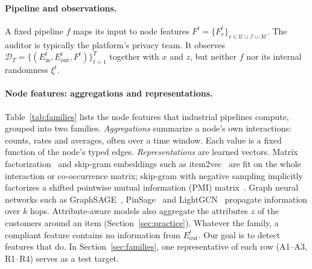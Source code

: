 \documentclass[10pt,twocolumn,letterpaper]{article}
\theoremstyle{definition}
\newcommand{\Ein}{E_{\mathrm{in}}}
\newcommand{\Eout}{E_{\mathrm{out}}}
\begin{document}
\paragraph{Pipeline and observations.}
A fixed pipeline $f$ maps its input to node features
$F^t=\{F_v^t\}_{v\in\mathcal{U}\cup\mathcal{I}\cup\mathcal{M}}$. The auditor is
typically the platform's privacy team. It observes
$\mathcal{D}_T=\{(\Ein^t,\Eout^t,F^t)\}_{t=1}^{T}$ together with $x$ and $z$, but
neither $f$ nor its internal randomness $\xi^t$.

\paragraph{Node features: aggregations and representations.}
Table~\ref{tab:families} lists the node features that industrial pipelines
compute, grouped into two families. \emph{Aggregations} summarize a node's own
interactions: counts, rates and averages, often over a time window. Each value
is a fixed function of the node's typed edges. \emph{Representations} are
learned vectors. Matrix factorization~\citep{koren2009matrix} and skip-gram
embeddings such as item2vec~\citep{barkan2016item2vec,grbovic2018real} are fit
on the whole interaction or co-occurrence matrix; skip-gram with negative
sampling implicitly factorizes a shifted pointwise mutual information
(PMI) matrix~\citep{levy2014neural}. Graph neural networks such as
GraphSAGE~\citep{hamilton2017graphsage}, PinSage~\citep{ying2018graph} and
LightGCN~\citep{he2020lightgcn} propagate information over $k$ hops.
Attribute-aware models also aggregate the attributes $z$ of the customers
around an item (Section~\ref{sec:practice}). Whatever the family, a compliant
feature contains no information from $\Eout^t$. Our goal is to detect features
that do. In Section~\ref{sec:families}, one representative of each row
(A1--A3, R1--R4) serves as a test target.
\end{document}
